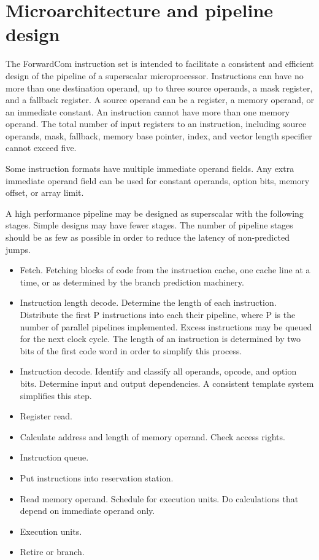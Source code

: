 \documentclass[forwardcom.tex]{subfiles}
\begin{document}
\RaggedRight

\chapter{Microarchitecture and pipeline design}
The ForwardCom instruction set is intended to facilitate a consistent and efficient design of the pipeline of a superscalar microprocessor. Instructions can have no more than one destination operand, up to three source operands, a mask register, and a fallback register. A source operand can be a register, a memory operand, or an immediate constant. An instruction cannot have more than one memory operand. The total number of input registers to an instruction, including source operands, mask, fallback, memory base pointer, index, and vector length specifier cannot exceed five.
\vv

Some instruction formats have multiple immediate operand fields. Any extra immediate operand field can be used for constant operands, option bits, memory offset, or array limit. 
\vv

A high performance pipeline may be designed as superscalar with the following stages. Simple designs may have fewer stages. The number of pipeline stages should be as few as possible in order to reduce the latency of non-predicted jumps.

\begin{itemize}
\item  Fetch. Fetching blocks of code from the instruction cache, one cache line at a time, or as determined by the branch prediction machinery. 

\item  Instruction length decode. Determine the length of each instruction. Distribute the first P instructions into each their pipeline, where P is the number of parallel pipelines implemented. Excess instructions may be queued for the next clock cycle. The length of an instruction is determined by two bits of the first code word in order to simplify this process.

\item  Instruction decode. Identify and classify all operands, opcode, and option bits. Determine input and output dependencies. A consistent template system simplifies this step.

\item  Register read.

\item  Calculate address and length of memory operand. Check access rights.

\item  Instruction queue. 

\item  Put instructions into reservation station.

\item  Read memory operand. Schedule for execution units. Do calculations that depend on immediate operand only.

\item  Execution units.  

\item  Retire or branch. 
\end{itemize}
\end{document}

